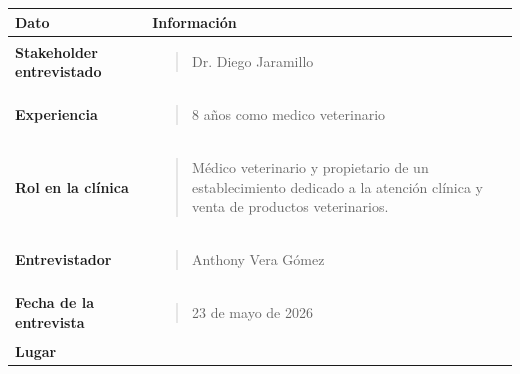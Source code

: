 \documentclass[
]{article}
\newcounter{none} %
\begin{document}
{\def\LTcaptype{none} %
\begin{longtable}[]{@{}
  >{\raggedright\arraybackslash}p{}
  >{\raggedright\arraybackslash}p{}@{}}
\toprule\noalign{}
\begin{minipage}[b]{\linewidth}\centering
\textbf{Dato}
\end{minipage} & \begin{minipage}[b]{\linewidth}\centering
\textbf{Información}
\end{minipage} \\
\midrule\noalign{}
\endhead
\bottomrule\noalign{}
\endlastfoot
\textbf{Stakeholder entrevistado} &
\begin{minipage}[t]{\linewidth}\raggedright
\begin{quote}
Dr. Diego Jaramillo
\end{quote}
\end{minipage} \\
\textbf{Experiencia} & \begin{minipage}[t]{\linewidth}\raggedright
\begin{quote}
8 años como medico veterinario
\end{quote}
\end{minipage} \\
\textbf{Rol en la clínica} & \begin{minipage}[t]{\linewidth}\raggedright
\begin{quote}
Médico veterinario y propietario de un establecimiento dedicado a la
atención clínica y venta de productos veterinarios.
\end{quote}
\end{minipage} \\
\textbf{Entrevistador} & \begin{minipage}[t]{\linewidth}\raggedright
\begin{quote}
Anthony Vera Gómez
\end{quote}
\end{minipage} \\
\textbf{Fecha de la entrevista} &
\begin{minipage}[t]{\linewidth}\raggedright
\begin{quote}
23 de mayo de 2026
\end{quote}
\end{minipage} \\
\textbf{Lugar} & \begin{minipage}[t]{\linewidth}\raggedright

\end{minipage}
\end{longtable}}
\end{document}
